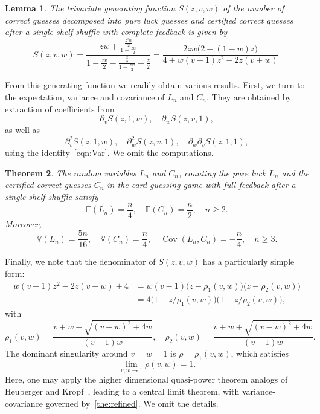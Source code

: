 \documentclass[10pt,reqno,a4paper]{amsart}
\newtheorem{theorem}{Theorem}
\newtheorem{lem}[theorem]{Lemma}
\theoremstyle{definition}
\def\E{{\mathbb {E}}}
\def\Var{{\mathbb {V}}}
\DeclareMathOperator{\Cov}{Cov}
\begin{document}
\begin{lem}
\label{lem:gfMultiVar}
The trivariate generating function $S(z,v,w)$ of the number of correct guesses decomposed into pure luck guesses and certified correct guesses after a single shelf shuffle with complete feedback is given by 
\[
S(z,v,w)=\frac{zw+\frac{\frac{z^2w}2}{1-\frac{zw}2}}{1-\frac{zv}2-\frac{\frac{z}2}{1-\frac{zw}2}
+\frac{z}2}=\frac{2zw\big(2 + (1 - w)z\big)}{4 + w(v - 1)z^2 -2z(v +w)}.
\]
\end{lem}
From this generating function we readily obtain various results. 
First, we turn to the expectation, variance and covariance of $L_n$ and $C_n$. 
They are obtained by extraction of coefficients from 
\[
\partial_vS(z,1,w),\quad \partial_wS(z,v,1),
\]
as well as
\[
\partial_v^2S(z,1,w),\quad \partial_w^2S(z,v,1),\quad \partial_w\partial_v S(z,1,1),
\]
using the identity~\eqref{eqn:Var}. We omit the computations.
\begin{theorem}
\label{the:refined}
The random variables $L_n$ and $C_n$, counting the pure luck $L_n$ and the certified correct guesses $C_n$ 
in the card guessing game with full feedback after a single shelf shuffle 
satisfy
\[
\E(L_n)=\frac{n}4,\quad \E(C_n)=\frac{n}2,\quad n\ge 2.
\]
Moreover,
\[
\Var(L_n)=\frac{5n}{16},\quad \Var(C_n)=\frac{n}4,\quad \Cov(L_n,C_n)=-\frac{n}4,\quad n\ge 3.
\]
\end{theorem}
Finally, we note that the denominator of $S(z,v,w)$ has a particularly simple form:
\begin{equation*}
\begin{split}
 w(v - 1)z^2 -2z(v +w)+4&= w(v - 1)\big(z-\rho_1(v,w)\big)\big(z-\rho_2(v,w)\big)\\
&=4\big(1-z/\rho_1(v,w)\big)\big(1-z/\rho_2(v,w)\big),
\end{split}
\end{equation*}
with
\[
\rho_1(v,w)=\frac{v+w-\sqrt{(v-w)^2+4w}}{(v-1)w},\quad \rho_2(v,w)=\frac{v+w+\sqrt{(v-w)^2+4w}}{(v-1)w}.
\]
The dominant singularity around $v=w=1$ is $\rho=\rho_1(v,w)$, which satisfies 
\[
\lim_{v,w\to 1}\rho(v,w)=1.
\]
Here, one may apply the higher dimensional quasi-power theorem analogs of Heuberger and Kropf~\cite{HeubergerKropf2018}, 
leading to a central limit theorem, with variance-covariance governed by~\eqref{the:refined}. We omit the details. 
\end{document}

